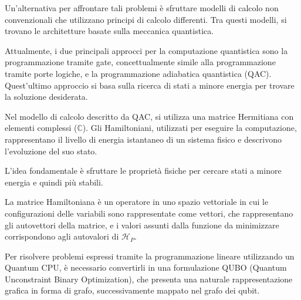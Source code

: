 \documentclass{article}
\begin{document}
Un'alternativa per affrontare tali problemi è sfruttare modelli di calcolo non convenzionali che utilizzano principi di calcolo differenti. Tra questi modelli, si trovano le architetture basate sulla meccanica quantistica.

Attualmente, i due principali approcci per la computazione quantistica sono la programmazione tramite gate, concettualmente simile alla programmazione tramite porte logiche, e la programmazione adiabatica quantistica (QAC). Quest'ultimo approccio si basa sulla ricerca di stati a minore energia per trovare la soluzione desiderata.

Nel modello di calcolo descritto da QAC, si utilizza una matrice Hermitiana con elementi complessi ($\mathbb{C}$). Gli Hamiltoniani, utilizzati per eseguire la computazione, rappresentano il livello di energia istantaneo di un sistema fisico e descrivono l'evoluzione del suo stato.

L'idea fondamentale è sfruttare le proprietà fisiche per cercare stati a minore energia e quindi più stabili.

La matrice Hamiltoniana è un operatore in uno spazio vettoriale in cui le configurazioni delle variabili sono rappresentate come vettori, che rappresentano gli autovettori della matrice, e i valori assunti dalla funzione da minimizzare corrispondono agli autovalori di $\mathcal{H}_P$. 

Per risolvere problemi espressi tramite la programmazione lineare utilizzando un Quantum CPU, è necessario convertirli in una formulazione QUBO (Quantum Unconstraint Binary Optimization), che presenta una naturale rappresentazione grafica in forma di grafo, successivamente mappato nel grafo dei qubit.
\end{document}
